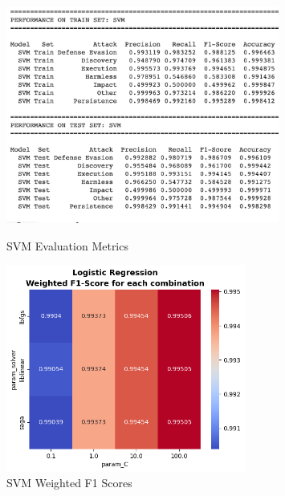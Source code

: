 \begin{figure}[H]
            \begin{minipage}{\textwidth}
                \begin{minipage}[c]{0.48\textwidth}
                    \centering
                    \includegraphics[width=0.8\textwidth]{../figures/plots/section2/SVM_evaluation_metrics_1.png}
                    \caption{SVM Evaluation Metrics}
                    \label{fig:}
                \end{minipage}%
                \hfill%
                \begin{minipage}[c]{0.48\textwidth}
                    \centering
                    \includegraphics[width=0.7\textwidth]{../figures/plots/section2/weighted_f1_score_for_each_combination_of_parameters_logistic_regression.png}
                    \caption{SVM Weighted F1 Scores}
                    \label{fig:}
                \end{minipage}
            \end{minipage}
            

\end{figure}
